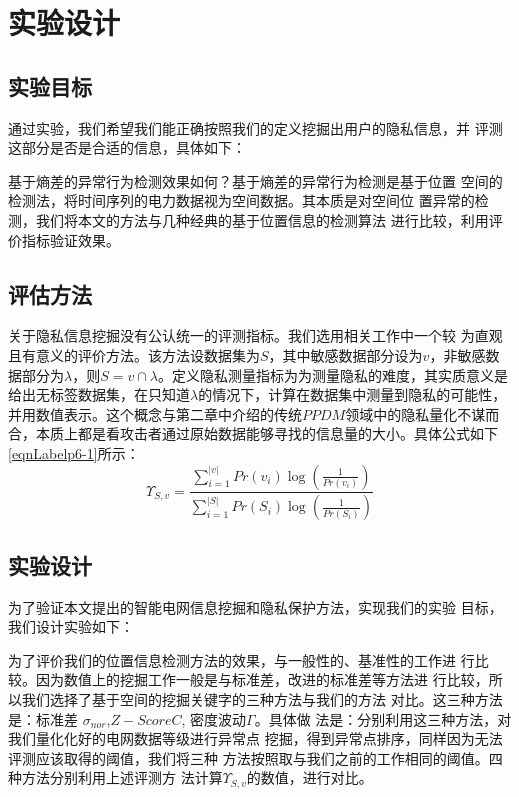\documentclass[10.5pt,twocolumn]{jbuaa}
\begin{document}
\section{实验设计}
\subsection{实验目标}
通过实验，我们希望我们能正确按照我们的定义挖掘出用户的隐私信息，并
评测这部分是否是合适的信息，具体如下：

基于熵差的异常行为检测效果如何？基于熵差的异常行为检测是基于位置
空间的检测法，将时间序列的电力数据视为空间数据。其本质是对空间位
置异常的检测，我们将本文的方法与几种经典的基于位置信息的检测算法
进行比较，利用评价指标验证效果。

\subsection{评估方法}
关于隐私信息挖掘没有公认统一的评测指标。我们选用相关工作中一个较
为直观且有意义的评价方法。该方法设数据集为$S$，其中敏感数据部分设为$v$，非敏感数据部分为$\lambda$，则$S = v ∩ \lambda$。定义隐私测量指标为为测量隐私的难度，其实质意义是给出无标签数据集，在只知道$\lambda$的情况下，计算在数据集中测量到隐私的可能性，并用数值表示。这个概念与第二章中介绍的传统$PPDM$领域中的隐私量化不谋而合，本质上都是看攻击者通过原始数据能够寻找的信息量的大小。具体公式如下\ref{eqnLabelp6-1}所示：
\begin{equation}
\label{eqnLabelp6-1}
\Upsilon_{S,v} = \frac{\sum_{i=1}^{|v|}Pr(v_i)\log(\frac{1}{Pr(v_i)})}{\sum_{i=1}^{|S|}Pr(S_i)\log(\frac{1}{Pr(S_i)})}
\end{equation}

\subsection{实验设计}
为了验证本文提出的智能电网信息挖掘和隐私保护方法，实现我们的实验
目标，我们设计实验如下：

为了评价我们的位置信息检测方法的效果，与一般性的、基准性的工作进
行比较。因为数值上的挖掘工作一般是与标准差，改进的标准差等方法进
行比较，所以我们选择了基于空间的挖掘关键字的三种方法与我们的方法
对比。这三种方法是：标准差 $\sigma_{nor}$,$Z-ScoreC$, 密度波动$\Gamma$。具体做
法是：分别利用这三种方法，对我们量化化好的电网数据等级进行异常点
挖掘，得到异常点排序，同样因为无法评测应该取得的阈值，我们将三种
方法按照取与我们之前的工作相同的阈值。四种方法分别利用上述评测方
法计算$\Upsilon_{S,v}$的数值，进行对比。
\end{document}

